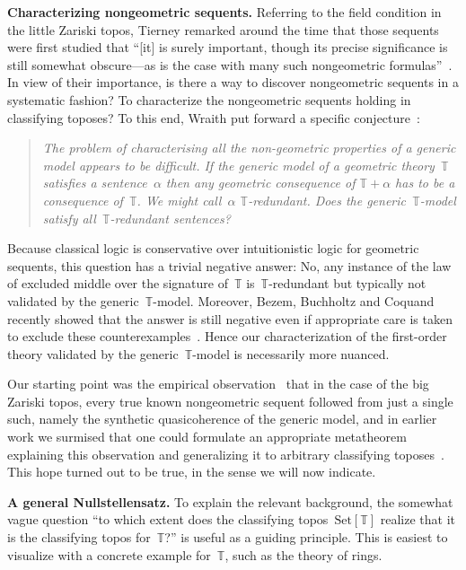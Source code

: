 \documentclass[oneside,reqno]{amsart}
\theoremstyle{definition}
\theoremstyle{plain}
\theoremstyle{remark}
\newcommand{\TT}{\mathbb{T}}
\newcommand{\Set}{\mathrm{Set}}
\renewcommand{\_}{\mathpunct{.}\,}
\newcommand{\?}{\,{:}\,}
\renewcommand{\paragraph}[1]{\noindent\textbf{#1.}}
\begin{document}
\paragraph{Characterizing nongeometric sequents} Referring to the field condition in the little Zariski topos,
Tierney remarked around the time that those sequents were first
studied that ``[it] is surely important, though its precise significance is
still somewhat obscure---as is the case with many such nongeometric
formulas''~\cite[p.~209]{tierney:spectrum}. In view of their importance, is
there a way to discover nongeometric sequents in a systematic fashion? To
characterize the nongeometric sequents holding in classifying toposes? To this
end, Wraith put forward a specific conjecture~\cite[p.~336]{wraith:intuitionistic-algebra}:
\begin{quote}
\emph{The problem of characterising all the non-geometric properties of a generic
model appears to be difficult. If the generic model of a geometric theory~$\TT$
satisfies a sentence~$\alpha$ then any geometric consequence of $\TT + \alpha$ has to be a
consequence of~$\TT$. We might call~$\alpha$ $\TT$-redundant. Does the
generic~$\TT$-model satisfy all~$\TT$-redundant sentences?}
\end{quote}
Because classical logic is conservative over intuitionistic logic for geometric
sequents, this question has a trivial negative answer: No, any instance of the
law of excluded middle over the signature of~$\TT$ is~$\TT$-redundant but
typically not validated by the generic~$\TT$-model. Moreover,
Bezem, Buchholtz and
Coquand recently showed that the answer is still negative even if appropriate
care is taken to exclude these
counterexamples~\cite{bezem-buchholtz-coquand:syntactic-forcing-models}. Hence our
characterization of the first-order theory validated by the generic~$\TT$-model
is necessarily more nuanced.

Our starting point was the empirical
observation~\cite[p.~164]{blechschmidt:phd} that in the case of the big
Zariski topos, every true known nongeometric sequent followed from just a
single such, namely the synthetic quasicoherence of the generic
model, and in earlier work we surmised that one could formulate an appropriate
metatheorem explaining this observation and generalizing it to arbitrary
classifying toposes~\cite[Speculation~22.1]{blechschmidt:phd}. This hope turned
out to be true, in the sense we will now indicate.
\medskip


\paragraph{A general Nullstellensatz} To explain the relevant background, the
somewhat vague question ``to which extent does the classifying
topos~$\Set[\TT]$ realize that it is the classifying topos for~$\TT$?'' is useful as
a guiding principle. This is easiest to visualize with a concrete example
for~$\TT$, such as the theory of rings.
\end{document}

